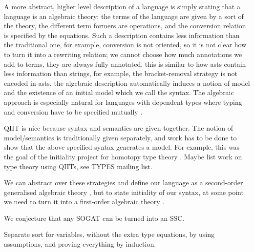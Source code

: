 \documentclass[sigplan,10pt,anonymous,review]{acmart}\settopmatter{printfolios=true,printccs=false,printacmref=false}
\begin{document}
A more abstract, higher level description of a language is simply
stating that a language is an algebraic theory: the terms of the
language are given by a sort of the theory, the different term formers
are operations, and the conversion relation is specified by the
equations. Such a description contains less information than the
traditional one, for example, conversion is not oriented, so it is not
clear how to turn it into a rewriting relation; we cannot choose how
much annotations we add to terms, they are always fully
annotated. this is similar to how asts contain less information than
strings, for example, the bracket-removal strategy is not encoded in
asts. the algebraic description automatically induces a notion of
model and the existence of an initial model
\cite{DBLP:journals/pacmpl/KaposiKA19} which we call the syntax. The
algebraic approach is especially natural for languages with dependent
types where typing and conversion have to be specified mutually
\cite{DBLP:conf/popl/AltenkirchK16}.

QIIT is nice because syntax and semantics are given together. The
notion of model/semantics is traditionally given separately, and work
has to be done to show that the above specified syntax generates a
model. For example, this was the goal of the initiality project for
homotopy type theory \cite{brunerie}. Maybe list work on type theory
using QIITs, see TYPES mailing list.

We can abstract over these strategies and define our language as a
second-order generalised algebraic theory
\cite{DBLP:journals/corr/abs-1904-04097}, but to state initiality of
our syntax, at some point we need to turn it into a first-order
algebraic theory \cite{DBLP:conf/fscd/BocquetKS23}.

We conjecture that any SOGAT can be turned into an SSC.

Separate sort for variables, without the extra type equations, by
using assumptions, and proving everything by induction.

{}

\end{document}
